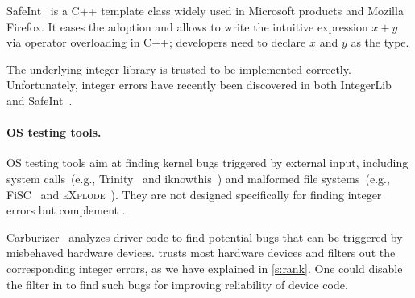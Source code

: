 SafeInt~\cite{safeint} is a C++ template class widely used in Microsoft
products and Mozilla Firefox.  It eases the adoption and allows to write
the intuitive expression $x + y$ via operator overloading in C++;
developers need to declare $x$ and $y$ as the 
type.

The underlying integer library is trusted to be implemented correctly.
Unfortunately, integer errors have recently been discovered in both
IntegerLib and SafeInt~\cite{ioc}.
%
%
%


\paragraph{OS testing tools.}
OS testing tools aim at finding kernel bugs triggered by external input,
including system calls~(e.g., Trinity~\cite{trinity} and
iknowthis~\cite{iknowthis}) and malformed file systems~(e.g.,
FiSC~\cite{fisc:yang} and \textsc{eXplode}~\cite{explode:yang}).
They are not designed specifically for finding integer errors
but complement \sys.


Carburizer~\cite{kadav:tolerating} analyzes driver code to find
potential bugs that can be triggered by misbehaved hardware devices.
\sys trusts most hardware devices and filters out the corresponding
integer errors, as we have explained in \autoref{s:rank}.  One could
disable the filter in \sys to find such bugs for improving reliability
of device code.
